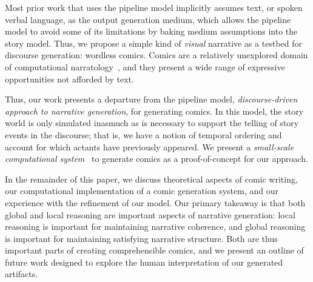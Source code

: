 Most prior work that uses the pipeline model implicitly assumes text, or
spoken verbal language, as the output generation medium, which allows the
pipeline model to avoid some of its limitations by baking medium
assumptions into the story model. %
Thus, we propose a simple kind of {\em visual} narrative as a testbed for
discourse generation: wordless comics. Comics are a relatively unexplored
domain of computational narratology~\cite{mani2012computational}, and they
present a wide range of expressive opportunities not afforded by text.

Thus, our work presents a departure from the pipeline model, 
\emph{discourse-driven approach to narrative generation}, for generating
comics. In this model, the story world is only simulated inasmuch as is
necessary to support the telling of story events in the discourse; that is,
we have a notion of temporal ordering and account for which actants have
previously appeared. We present a \emph{small-scale computational
system}~\cite{montfort2012small} to generate comics as a proof-of-concept
for our approach.

In the remainder of this paper, we discuss theoretical aspects of comic
writing, our computational implementation of a comic generation system, and
our experience with the refinement of our model. Our primary takeaway is
that both global and local reasoning are important aspects of
narrative generation: local reasoning is important for maintaining
narrative coherence, and global reasoning is important for
maintaining satisfying narrative structure. Both are thus important parts
of creating comprehensible comics, and we present an outline of future work
designed to explore the human interpretation of our generated artifacts.



